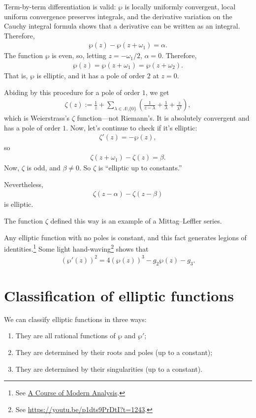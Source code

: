 \documentclass[11pt, oneside,margin=1in]{article}
\begin{document}
Term-by-term differentiation is valid: $\wp$ is locally uniformly convergent, local uniform convergence preserves integrals, and the derivative variation on the Cauchy integral formula shows that a derivative can be written as an integral. Therefore, 
\begin{align*}
	\wp(z) - \wp (z+\omega_1) = \alpha.
\end{align*}
The function $\wp$ is even, so, letting $z=-\omega_1/2$, $\alpha = 0$. Therefore,
\begin{align*}
	\wp(z) = \wp (z+\omega_1) = \wp(z+\omega_2).
\end{align*}
That is, $\wp$ is elliptic, and it has a pole of order $2$ at $z=0$. 

Abiding by this procedure for a pole of order $1$, we get
\begin{align*}
	\zeta(z) :=  \frac{1}{z} + \sum_{\lambda\in \Lambda\setminus\{0\}}^{} \left( \frac{1}{z-\lambda}+ \frac{1}{\lambda} + \frac{z}{\lambda^2} \right), 
\end{align*}
which is Weierstrass's $\zeta$ function---not Riemann's. It is absolutely convergent and has a pole of order $1$. Now, let's continue to check if it's elliptic:
\begin{align*}
	\zeta'(z) = -\wp (z),
\end{align*}
so 
\begin{align*}
	\zeta(z+\omega_1) - \zeta(z) = \beta.
\end{align*}
Now, $\zeta$ is odd, and $\beta\ne 0$. So $\zeta$ is ``elliptic up to constants.''

Nevertheless, 
\begin{align*}
	\zeta(z-\alpha) - \zeta (z-\beta)
\end{align*} 
is elliptic. 

The function $\zeta$ defined this way is an example of a Mittag--Leffler series.

Any elliptic function with no poles is constant, and this fact generates legions of identities.\footnote{See \underline{A Course of Modern Analysis}.} Some light hand-waving\footnote{See \url{https://youtu.be/p1dts9PrDtI?t=1243}.} shows that
\begin{align*}
	(\wp'(z)) ^2 = 4(\wp(z)) ^3 - g_2\wp(z) -  g_3.
\end{align*}

\section{Classification of elliptic functions}
We can classify elliptic functions in three ways:
\begin{enumerate}
	\item They are all rational functions of $\wp$ and $\wp'$;
	\item They are determined by their roots and poles (up to a constant); 
	\item They are determined by their singularities (up to a constant).
\end{enumerate}
\end{document}
